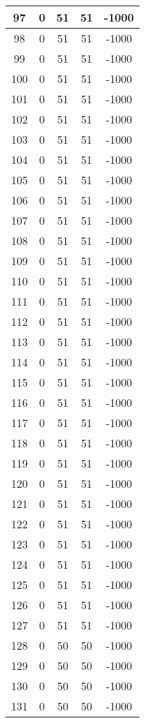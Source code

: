 \documentclass[letterpaper, 12pt]{article}
\begin{document}
\begin{longtable}{|c|c|c|c|c|}
\hline
97 & 0 & 51 & 51 & -1000 \\
\hline
98 & 0 & 51 & 51 & -1000 \\
\hline
99 & 0 & 51 & 51 & -1000 \\
\hline
100 & 0 & 51 & 51 & -1000 \\
\hline
101 & 0 & 51 & 51 & -1000 \\
\hline
102 & 0 & 51 & 51 & -1000 \\
\hline
103 & 0 & 51 & 51 & -1000 \\
\hline
104 & 0 & 51 & 51 & -1000 \\
\hline
105 & 0 & 51 & 51 & -1000 \\
\hline
106 & 0 & 51 & 51 & -1000 \\
\hline
107 & 0 & 51 & 51 & -1000 \\
\hline
108 & 0 & 51 & 51 & -1000 \\
\hline
109 & 0 & 51 & 51 & -1000 \\
\hline
110 & 0 & 51 & 51 & -1000 \\
\hline
111 & 0 & 51 & 51 & -1000 \\
\hline
112 & 0 & 51 & 51 & -1000 \\
\hline
113 & 0 & 51 & 51 & -1000 \\
\hline
114 & 0 & 51 & 51 & -1000 \\
\hline
115 & 0 & 51 & 51 & -1000 \\
\hline
116 & 0 & 51 & 51 & -1000 \\
\hline
117 & 0 & 51 & 51 & -1000 \\
\hline
118 & 0 & 51 & 51 & -1000 \\
\hline
119 & 0 & 51 & 51 & -1000 \\
\hline
120 & 0 & 51 & 51 & -1000 \\
\hline
121 & 0 & 51 & 51 & -1000 \\
\hline
122 & 0 & 51 & 51 & -1000 \\
\hline
123 & 0 & 51 & 51 & -1000 \\
\hline
124 & 0 & 51 & 51 & -1000 \\
\hline
125 & 0 & 51 & 51 & -1000 \\
\hline
126 & 0 & 51 & 51 & -1000 \\
\hline
127 & 0 & 51 & 51 & -1000 \\
\hline
128 & 0 & 50 & 50 & -1000 \\
\hline
129 & 0 & 50 & 50 & -1000 \\
\hline
130 & 0 & 50 & 50 & -1000 \\
\hline
131 & 0 & 50 & 50 & -1000 \\

\end{longtable}
\end{document}
